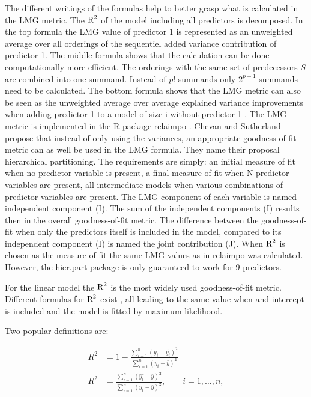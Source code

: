 \documentclass[11pt,a4paper,twoside]{book}\usepackage[]{graphicx}\usepackage[]{color}
\begin{document}
   The different writings of the formulas help to better grasp what is calculated in the LMG metric. The $\text{R}^2$ of the model including all predictors is decomposed. In the top formula the LMG value of predictor 1 is represented as an unweighted average over all orderings of the sequentiel added variance contribution of predictor 1. The middle formula shows that the calculation can be  done computationally more efficient. The orderings with the same set of predecessors $S$ are combined into one summand. Instead of $p!$ summands only $2^{p-1}$ summands need to be calculated. The bottom formula shows that the LMG metric can also be seen as the unweighted average over average explained variance improvements when adding predictor 1 to a model of size i without predictor 1 \citep{Gromping2015}. 
The LMG metric is implemented in the R package relaimpo .
Chevan and Sutherland propose that instead of only using the variances, an appropriate goodness-of-fit metric can as well be used in the LMG formula. They name their proposal hierarchical partitioning. The requirements are simply: an initial measure of fit when no predictor variable is present, a final measure of fit when N predictor variables are present, all intermediate models when various combinations of predictor variables are present. 
  The LMG component of each variable is named independent component (I). The sum of the independent components (I) results then in the overall goodness-of-fit metric. The difference between the goodness-of-fit when only the predictors itself is included in the model, compared to its independent component (I) is named the joint contribution (J).  When $\text{R}^2$ is chosen as the measure of fit the same LMG values as in relaimpo was calculated. However,  the hier.part package is only guaranteed to work for 9 predictors. 

For the linear model the $\text{R}^2$ is the most widely used goodness-of-fit metric.  Different formulas for $\text{R}^2$ exist \cite{Kvalseth1985}, all leading to the same value when and intercept is included and the model is fitted by maximum likelihood. 

Two popular definitions are:
   
      \begin{align} 
     R^2 &= 1 - \frac{\sum_{i=1}^{n}(y_{i} - \hat{y_{i}})^2}{\sum_{i=1}^{n}(y_{i}-\bar{y})^2}   \label{eq:rtwo1} \\
     R^2 &= \frac{\sum_{i=1}^{n}(\hat{y_{i}} - \bar{y})^2}{\sum_{i=1}^{n}(y_{i}-\bar{y})^2}, \qquad i = 1,\dots,n,   \label{eq:rtwo2} 
   \end{align} 
   
\end{document}
